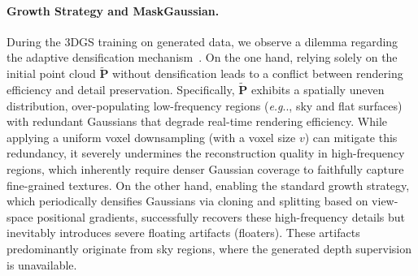 \documentclass{article} %
\makeatletter
\DeclareRobustCommand\onedot{\futurelet\@let@token\@onedot}
\def\@onedot{\ifx\@let@token.\else.\null\fi\xspace}
\def\eg{\emph{e.g}\onedot} \def\Eg{\emph{E.g}\onedot}
\makeatother
\begin{document}
\paragraph{Growth Strategy and MaskGaussian.}
During the 3DGS training on generated data, we observe a dilemma regarding the adaptive densification mechanism~\cite{kerbl20233d}.
On the one hand, relying solely on the initial point cloud $\mathbf{\tilde{P}}$ without densification leads to a conflict between rendering efficiency and detail preservation.
Specifically, $\mathbf{\tilde{P}}$ exhibits a spatially uneven distribution, over-populating low-frequency regions (\eg, sky and flat surfaces) with redundant Gaussians that degrade real-time rendering efficiency. While applying a uniform voxel downsampling (with a voxel size $v$) can mitigate this redundancy, it severely undermines the reconstruction quality in high-frequency regions, which inherently require denser Gaussian coverage to faithfully capture fine-grained textures. On the other hand, enabling the standard growth strategy, which periodically densifies Gaussians via cloning and splitting based on view-space positional gradients, successfully recovers these high-frequency details but inevitably introduces severe floating artifacts (floaters). These artifacts predominantly originate from sky regions, where the generated depth supervision is unavailable.
\end{document}
